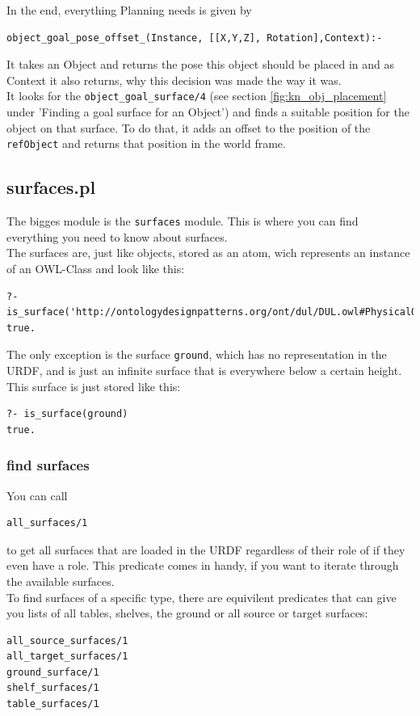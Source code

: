 \documentclass[main.tex]{subfiles}
\begin{document}
In the end, everything Planning needs is given by
\begin{lstlisting}
object_goal_pose_offset_(Instance, [[X,Y,Z], Rotation],Context):-
\end{lstlisting}
It takes an Object and returns the pose this object should be placed in and as Context it also returns, why this decision was made the way it was.\\
It looks for the \texttt{object\_goal\_surface/4} (see section \ref{fig:kn_obj_placement} under 'Finding a goal surface for an Object') and finds a suitable position for the object on that surface. To do that, it adds an offset to the position of the \texttt{refObject} and returns that position in the world frame.

\subsection{surfaces.pl}

The bigges module is the \texttt{surfaces} module. This is where you can find everything you need to know about surfaces.\\
The surfaces are, just like objects, stored as an atom, wich represents an instance of an OWL-Class and look like this:
\begin{lstlisting}
?- is_surface('http://ontologydesignpatterns.org/ont/dul/DUL.owl#PhysicalObject_UHOJSVEC')
true.
\end{lstlisting}
The only exception is the surface \texttt{ground}, which has no representation in the URDF, and is just an infinite surface that is everywhere below a certain height. This surface is just stored like this:
\begin{lstlisting}
?- is_surface(ground)
true.
\end{lstlisting}

\subsubsection{find surfaces}

You can call
\begin{lstlisting}
all_surfaces/1
\end{lstlisting}
to get all surfaces that are loaded in the URDF regardless of their role of if they even have a role. This predicate comes in handy, if you want to iterate through the available surfaces.\\
To find surfaces of a specific type, there are equivilent predicates that can give you lists of all tables, shelves, the ground or all source or target surfaces:
\begin{lstlisting}
all_source_surfaces/1
all_target_surfaces/1
ground_surface/1
shelf_surfaces/1
table_surfaces/1
\end{lstlisting}
\end{document}
